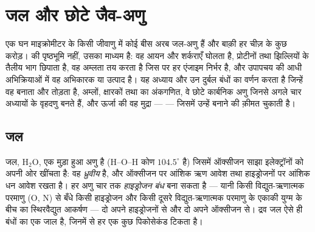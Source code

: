 \chapter{जल और छोटे जैव-अणु}\label{ch:b1:water-small-molecules}

एक घन माइक्रोमीटर के किसी जीवाणु में कोई बीस अरब जल-अणु हैं और बाक़ी हर
चीज़ के कुछ करोड़।   की पृष्ठभूमि नहीं, उसका माध्यम है: वह आयन
और शर्कराएँ घोलता है, प्रोटीनों तथा झिल्लियों के तैलीय भाग छिपाता है, वह
अम्लता तय करता है जिस पर हर एंजाइम निर्भर है, और उपापचय की आधी
अभिक्रियाओं में वह अभिकारक या उत्पाद है। यह अध्याय  और उन दुर्बल बंधों
का वर्णन करता है जिन्हें वह बनाता और तोड़ता है, अम्लों, क्षारकों तथा
 का अंकगणित, वे छोटे कार्बनिक अणु जिनसे अगले चार अध्यायों के
वृहदणु बनते हैं, और ऊर्जा की वह मुद्रा ---  --- जिसमें  उन्हें
बनाने की क़ीमत चुकाती है।

\section{जल}

\begin{definition}[जल-अणु]\label{def:b1:water-small-molecules:water}
जल, $\mathrm{H_2O}$, एक मुड़ा हुआ अणु है (H--O--H कोण
$104.5^\circ$ है) जिसमें ऑक्सीजन साझा इलेक्ट्रॉनों को अपनी ओर खींचता है:
वह \emph{ध्रुवीय} है, और ऑक्सीजन पर आंशिक ऋण आवेश तथा
हाइड्रोजनों पर आंशिक धन आवेश रखता है। हर अणु चार तक \emph{हाइड्रोजन
बंध} बना सकता है --- यानी किसी विद्युत-ऋणात्मक
परमाणु (O, N) से बँधे किसी हाइड्रोजन और किसी दूसरे विद्युत-ऋणात्मक परमाणु
के एकाकी युग्म के बीच का स्थिरवैद्युत आकर्षण --- दो अपने हाइड्रोजनों से
और दो अपने ऑक्सीजन से। द्रव जल ऐसे ही बंधों का एक जाल है, जिनमें से हर
एक कुछ पिकोसेकंड टिकता है।
\end{definition}

